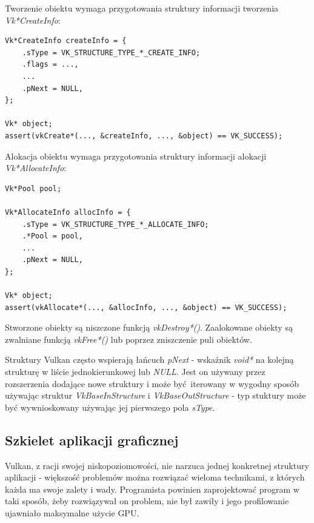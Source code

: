Tworzenie obiektu wymaga przygotowania struktury informacji tworzenia \textit{Vk*CreateInfo}:
\lstset{language=C}
\begin{lstlisting}
Vk*CreateInfo createInfo = {
	.sType = VK_STRUCTURE_TYPE_*_CREATE_INFO;
	.flags = ...,
	...
	.pNext = NULL,
};

Vk* object;
assert(vkCreate*(..., &createInfo, ..., &object) == VK_SUCCESS);
\end{lstlisting}

Alokacja obiektu wymaga przygotowania struktury informacji alokacji \textit{Vk*AllocateInfo}:
\lstset{language=C}
\begin{lstlisting}
Vk*Pool pool;

Vk*AllocateInfo allocInfo = {
	.sType = VK_STRUCTURE_TYPE_*_ALLOCATE_INFO;
	.*Pool = pool,
	...
	.pNext = NULL,
};

Vk* object;
assert(vkAllocate*(..., &allocInfo, ..., &object) == VK_SUCCESS);
\end{lstlisting}

Stworzone obiekty są niszczone funkcją \textit{vkDestroy*()}.
Zaalokowane obiekty są zwalniane funkcją \textit{vkFree*()} lub poprzez zniszczenie puli obiektów.

Struktury Vulkan często wspierają łańcuch \textit{pNext} - wskaźnik \textit{void*} na kolejną strukturę w liście jednokierunkowej lub \textit{NULL}. Jest on używany przez rozszerzenia dodające nowe struktury i może być iterowany w wygodny sposób używając struktur \textit{VkBaseInStructure} i \textit{VkBaseOutStructure} - typ stuktury może być wywnioskowany używając jej pierwszego pola \textit{sType}.

\subsection{Szkielet aplikacji graficznej}

Vulkan, z racji swojej niskopoziomowości, nie narzuca jednej konkretnej struktury aplikacji - większość problemów można rozwiązać wieloma technikami, z których każda ma swoje zalety i wady.
Programista powinien zaprojektować program w taki sposób, żeby rozwiązywał on problem, nie był zawiły i jego profilowanie ujawniało maksymalne użycie GPU.

